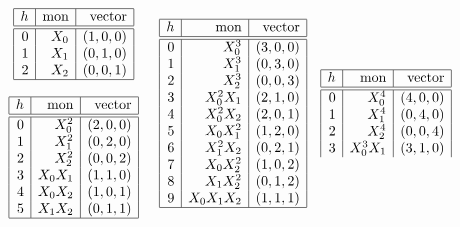 \begin{table}
$$
\begin{array}{c}
\begin{array}{|r|r|r|}
\hline
h &  \mbox{mon} & \mbox{vector} \\
\hline
\hline
0 & X_0 & ( 1, 0, 0 )\\
1 & X_1 & ( 0, 1, 0 )\\
2 & X_2 & ( 0, 0, 1 )\\
\hline
\end{array}\\
\ \\
\begin{array}{|r|r|r|}
\hline
h &  \mbox{mon} & \mbox{vector} \\
\hline
\hline
0 & X_0^2 & ( 2, 0, 0 )\\
1 & X_1^2 & ( 0, 2, 0 )\\
2 & X_2^2 & ( 0, 0, 2 )\\
3 & X_0X_1 & ( 1, 1, 0 )\\
4 & X_0X_2 & ( 1, 0, 1 )\\
5 & X_1X_2 & ( 0, 1, 1 )\\
\hline
\end{array}
\end{array}
\quad
\begin{array}{|r|r|r|}
\hline
h &  \mbox{mon} & \mbox{vector} \\
\hline
\hline
0 & X_0^3 & ( 3, 0, 0 )\\
1 & X_1^3 & ( 0, 3, 0 )\\
2 & X_2^3 & ( 0, 0, 3 )\\
3 & X_0^2X_1 & ( 2, 1, 0 )\\
4 & X_0^2X_2 & ( 2, 0, 1 )\\
5 & X_0X_1^2 & ( 1, 2, 0 )\\
6 & X_1^2X_2 & ( 0, 2, 1 )\\
7 & X_0X_2^2 & ( 1, 0, 2 )\\
8 & X_1X_2^2 & ( 0, 1, 2 )\\
9 & X_0X_1X_2 & ( 1, 1, 1 )\\
\hline
\end{array}
\quad
\begin{array}{|r|r|r|}
\hline
h &  \mbox{mon} & \mbox{vector} \\
\hline
\hline
0 & X_0^4 & ( 4, 0, 0 )\\
1 & X_1^4 & ( 0, 4, 0 )\\
2 & X_2^4 & ( 0, 0, 4 )\\
3 & X_0^3X_1 & ( 3, 1, 0 )\\

\end{array}$$
\end{table}
